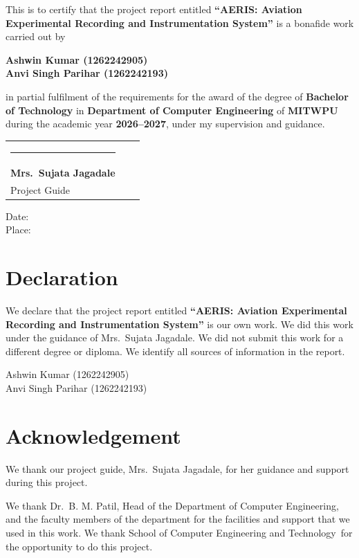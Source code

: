\documentclass[12pt,a4paper]{report}
\newcommand{\projecttitle}{AERIS: Aviation Experimental Recording and
Instrumentation System}
\newcommand{\studentnames}{Ashwin Kumar (1262242905)\\Anvi Singh Parihar (1262242193)}
\newcommand{\guidename}{Mrs.\ Sujata Jagadale}
\newcommand{\hodname}{Dr.\ B. M. Patil}
\newcommand{\department}{Department of Computer Engineering}
\newcommand{\collegename}{School of Computer Engineering and Technology}
\newcommand{\universityname}{MITWPU}
\newcommand{\degreename}{Bachelor of Technology}
\newcommand{\academicyear}{2026--2027}
\begin{document}
\noindent This is to certify that the project report entitled
\textbf{``\projecttitle''} is a bonafide work carried out by

\begin{center}
\textbf{\studentnames}
\end{center}

\noindent in partial fulfilment of the requirements for the award of the degree of
\textbf{\degreename} in \textbf{\department} of \textbf{\universityname}
during the academic year \textbf{\academicyear}, under my supervision and guidance.

\vspace{2.2cm}
\noindent
\begin{tabularx}{\textwidth}{XXX}
\rule{4cm}{0.4pt} & \\
\textbf{\guidename}\\
Project Guide & \\
\end{tabularx}

\vspace{1.5cm}
\noindent Date: \hrulefill \\[0.3cm]
Place: \hrulefill

\chapter*{Declaration}
We declare that the project report entitled \textbf{``\projecttitle''}
is our own work. We did this work under the guidance of \guidename. We did not
submit this work for a different degree or diploma. We identify all sources of
information in the report.

\vspace{2cm}
\begin{flushright}
\studentnames
\end{flushright}

\chapter*{Acknowledgement}
We thank our project guide, \guidename, for her guidance and support during this project.

We thank \hodname, Head of the \department, and the faculty members of the
department for the facilities and support that we used in this work.
We thank \collegename\ for the opportunity to do this project.
\end{document}
